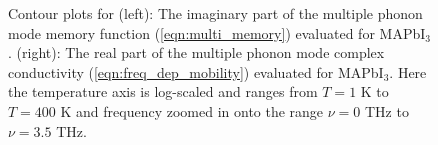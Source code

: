 \begin{figure}[h]
\caption{Contour plots for (left): The imaginary part of the multiple phonon mode memory function (\ref{eqn:multi_memory}) evaluated for MAPbI$_3$. (right): The real part of the multiple phonon mode complex conductivity (\ref{eqn:freq_dep_mobility}) evaluated for MAPbI$_3$. Here the temperature axis is log-scaled and ranges from $T = 1$ K to $T = 400$ K and frequency zoomed in onto the range $\nu = 0$ THz to $\nu = 3.5$ THz.}
\label{fig:thermal_thz}
\end{figure}

